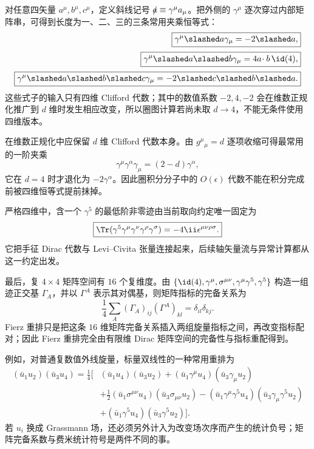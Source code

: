 对任意四矢量 $a^\mu,b^\mu,c^\mu$，定义斜线记号 $\slashed a\equiv\gamma^\mu a_\mu$。把外侧的 $\gamma^\mu$ 逐次穿过内部矩阵串，可得到长度为一、二、三的三条常用夹乘恒等式：
\begin{align}
 \boxed{\gamma^\mu\slashed a\gamma_\mu=-2\slashed a,}
 \label{eq:gamma-one-sandwich-r10}\\[2pt]
 \boxed{\gamma^\mu\slashed a\slashed b\gamma_\mu
 =4a\!\cdot b\,\id(4),}
 \label{eq:gamma-two-sandwich-r10}\\[2pt]
 \boxed{\gamma^\mu\slashed a\slashed b\slashed c\gamma_\mu
 =-2\slashed c\slashed b\slashed a.}
 \label{eq:gamma-three-sandwich-r10}
\end{align}
这些式子的输入只有四维 Clifford 代数；其中的数值系数 $-2,4,-2$ 会在维数正规化推广到 $d$ 维时发生相应改变，所以圈图计算若尚未取 $d\to4$，不能无条件使用四维版本。


在维数正规化中应保留 $d$ 维 Clifford 代数本身。由 $g^\mu{}_{\mu}=d$ 逐项收缩可得最常用的一阶夹乘
\begin{equation}
 \boxed{\gamma^\mu\gamma^\alpha\gamma_\mu=(2-d)\gamma^\alpha,}
 \label{eq:gamma-d-sandwich-r68}
\end{equation}
它在 $d=4$ 时才退化为 $-2\gamma^\alpha$。因此圈积分分子中的 $O(\epsilon)$ 代数不能在积分完成前被四维恒等式提前抹掉。

严格四维中，含一个 $\gamma^5$ 的最低阶非零迹由当前取向约定唯一固定为
\begin{equation}
 \boxed{\Tr(\gamma^5\gamma^\mu\gamma^\nu\gamma^\rho\gamma^\sigma)
 =-4\ii\epsilon^{\mu\nu\rho\sigma}.}
 \label{eq:gamma5-four-trace-r68}
\end{equation}
它把手征 Dirac 代数与 Levi--Civita 张量连接起来，后续轴矢量流与异常计算都从这一约定出发。

最后，复 $4\times4$ 矩阵空间有 $16$ 个复维度。由
$\{\id(4),\gamma^\mu,\sigma^{\mu\nu},\gamma^\mu\gamma^5,\gamma^5\}$
构造一组迹正交基 $\Gamma_A$，并以 $\Gamma^A$ 表示其对偶基，则矩阵指标的完备关系为
\begin{equation}
 \boxed{
 \frac14\sum_A
 (\Gamma_A)_{ij}(\Gamma^A)_{kl}
 =\delta_{il}\delta_{kj}.}
 \label{eq:dirac-matrix-completeness-r10}
\end{equation}
Fierz 重排只是把这条 $16$ 维矩阵完备关系插入两组旋量指标之间，再改变指标配对；因此 Fierz 重排完全由有限维 Dirac 矩阵空间的完备性与指标重配得到。


例如，对普通复数值外线旋量，标量双线性的一种常用重排为
\begin{align}
 (\bar u_1u_2)(\bar u_3u_4)
 =\frac14\Big[&
 (\bar u_1u_4)(\bar u_3u_2)
 +(\bar u_1\gamma^\mu u_4)(\bar u_3\gamma_\mu u_2)
 \nonumber\\
 &+\frac12(\bar u_1\sigma^{\mu\nu}u_4)(\bar u_3\sigma_{\mu\nu}u_2)
 -(\bar u_1\gamma^\mu\gamma^5u_4)(\bar u_3\gamma_\mu\gamma^5u_2)
 \nonumber\\
 &+(\bar u_1\gamma^5u_4)(\bar u_3\gamma^5u_2)\Big].
 \label{eq:fierz-scalar-r68}
\end{align}
若 $u_i$ 换成 Grassmann 场，还必须另外计入为改变场次序而产生的统计负号；矩阵完备系数与费米统计符号是两件不同的事。

